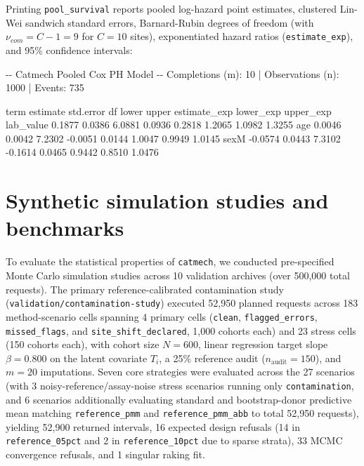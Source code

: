 \documentclass[
]{article}
\newenvironment{Shaded}{\begin{snugshade}}{\end{snugshade}}
\newcommand{\NormalTok}[1]{#1}
\begin{document}
Printing \texttt{pool\_survival} reports pooled log-hazard point
estimates, clustered Lin-Wei sandwich standard errors, Barnard-Rubin
degrees of freedom (with \(\nu_{com} = C - 1 = 9\) for \(C = 10\)
sites), exponentiated hazard ratios (\texttt{estimate\_exp}), and 95\%
confidence intervals:

\begin{Shaded}
\begin{Highlighting}[]
\NormalTok{{-}{-} Catmech Pooled Cox PH Model {-}{-}}
\NormalTok{Completions (m): 10 | Observations (n): 1000 | Events: 735}

\NormalTok{      term estimate std.error     df   lower  upper estimate\_exp lower\_exp upper\_exp}
\NormalTok{ lab\_value   0.1877    0.0386 6.0881  0.0936 0.2818       1.2065    1.0982    1.3255}
\NormalTok{       age   0.0046    0.0042 7.2302 {-}0.0051 0.0144       1.0047    0.9949    1.0145}
\NormalTok{      sexM  {-}0.0574    0.0443 7.3102 {-}0.1614 0.0465       0.9442    0.8510    1.0476}
\end{Highlighting}
\end{Shaded}

\section{Synthetic simulation studies and
benchmarks}\label{synthetic-simulation-studies-and-benchmarks}

To evaluate the statistical properties of \texttt{catmech}, we conducted
pre-specified Monte Carlo simulation studies across 10 validation
archives (over 500,000 total requests). The primary reference-calibrated
contamination study (\texttt{validation/contamination-study}) executed
52,950 planned requests across 183 method-scenario cells spanning 4
primary cells (\texttt{clean}, \texttt{flagged\_errors},
\texttt{missed\_flags}, and \texttt{site\_shift\_declared}, 1,000
cohorts each) and 23 stress cells (150 cohorts each), with cohort size
\(N = 600\), linear regression target slope \(\beta = 0.800\) on the
latent covariate \(T_i\), a 25\% reference audit
(\(n_{\text{audit}} = 150\)), and \(m = 20\) imputations. Seven core
strategies were evaluated across the 27 scenarios (with 3
noisy-reference/assay-noise stress scenarios running only
\texttt{contamination}, and 6 scenarios additionally evaluating standard
and bootstrap-donor predictive mean matching \texttt{reference\_pmm} and
\texttt{reference\_pmm\_abb} to total 52,950 requests), yielding 52,900
returned intervals, 16 expected design refusals (14 in
\texttt{reference\_05pct} and 2 in \texttt{reference\_10pct} due to
sparse strata), 33 MCMC convergence refusals, and 1 singular raking fit.
\end{document}
